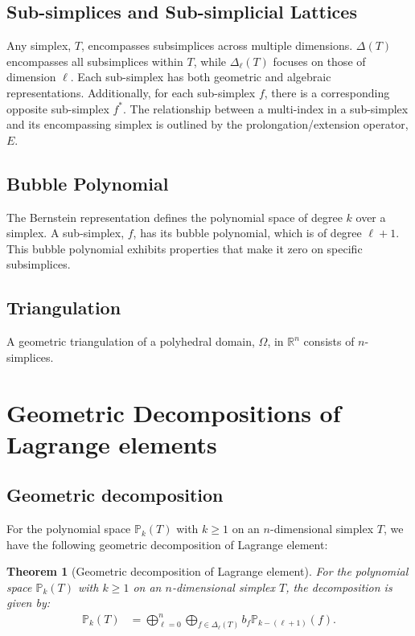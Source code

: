 \documentclass[12pt, a4paper]{article}
\newtheorem{theorem}{Theorem}
\begin{document}
\subsection{Sub-simplices and Sub-simplicial Lattices}

Any simplex, \(T\), encompasses subsimplices across multiple dimensions.
\(\Delta(T)\) encompasses all subsimplices within \(T\), while \(\Delta_{\ell}(T)\)
focuses on those of dimension \(\ell\). Each sub-simplex has both geometric and algebraic
representations. Additionally, for each sub-simplex \(f\), there is a corresponding
opposite sub-simplex \(f^*\). The relationship between a multi-index in a sub-simplex
and its encompassing simplex is outlined by the prolongation/extension operator, \(E\).


\subsection{Bubble Polynomial}
The Bernstein representation defines the polynomial space of degree \(k\) over a
simplex. A sub-simplex, \(f\), has its bubble polynomial, which is of 
degree \(\ell + 1\). This bubble polynomial exhibits properties that make it zero on specific subsimplices.

\subsection{Triangulation}
A geometric triangulation of a polyhedral domain, \(\Omega\), in \(\mathbb R^n\)
consists of \(n\)-simplices. 


\section{Geometric Decompositions of Lagrange elements}

\subsection{Geometric decomposition}

For the polynomial space $\mathbb P_k(T)$ with $k\geq 1$ on an $n$-dimensional simplex $T$, we have the following geometric decomposition of Lagrange element:

\begin{theorem}[Geometric decomposition of Lagrange element]
\label{thm:Lagrangedec}
For the polynomial space $\mathbb P_k(T)$ with $k\geq 1$ on an $n$-dimensional simplex $T$, the decomposition is given by:
\begin{align}
\mathbb P_k(T) &= \bigoplus_{\ell = 0}^n \bigoplus_{f\in \Delta_{\ell}(T)} b_f\mathbb P_{k - (\ell +1)} (f).
\end{align}
\end{theorem}
\end{document}
